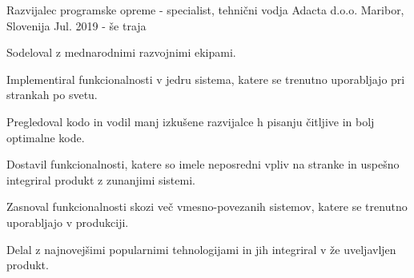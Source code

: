 

\begin{cventries}

\cventry
    {Razvijalec programske opreme - specialist, tehnični vodja} %
    {Adacta d.o.o.} %
    {Maribor, Slovenija} %
    {Jul. 2019 - še traja} %
    {
      \begin{cvitems}          
        \item {Sodeloval z mednarodnimi razvojnimi ekipami.}
        \item {Implementiral funkcionalnosti v jedru sistema, 
        katere se trenutno uporabljajo pri strankah po svetu.}
        \item {Pregledoval kodo in vodil manj izkušene razvijalce 
        h pisanju čitljive in bolj optimalne kode.}
        \item {Dostavil funkcionalnosti, katere so imele neposredni 
        vpliv na stranke in uspešno integriral produkt z zunanjimi sistemi.}
        \item {Zasnoval funkcionalnosti skozi več vmesno-povezanih sistemov,
         katere se trenutno uporabljajo v produkciji.}
        \item {Delal z najnovejšimi popularnimi tehnologijami in jih integriral 
        v že uveljavljen produkt.}
      \end{cvitems}
    }


\end{cventries}
